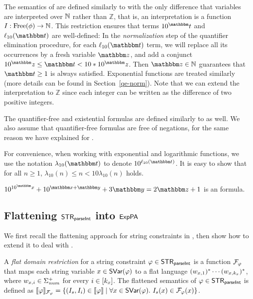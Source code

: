 The semantics of {\paexp} are defined similarly to {\pa} with the only difference that variables are interpreted over $\mathbb{N}$ rather than $\mathbb Z$, that is, an interpretation is a function $I:\mathrm{Free}(\phi)\to \mathbb {\mathbb{N}}$. 
This restriction ensures that terms $10^\iterm$ and $\ell_{10}(\iterm)$ are well-defined: In the \emph{normalization} step of the quantifier elimination procedure, for each $\ell_{10}(\iterm)$ term, we will replace all its occurrences by a fresh variable $\ivarz$, and add a conjunct $10^\ivarz \le \iterm < 10*10^\ivarz$. 
Then $\ivarz\in\Nat$ guarantees that $\iterm \ge 1$ is always satisfied.
Exponential functions are treated similarly
(more details can be found in Section~\ref{qe-norm}).
Note that we can extend the interpretation to $\mathbb Z$ since each integer can be written as the difference of two positive integers.

The quantifier-free and existential {\paexp} formulas are defined similarly to {\pa} as well.
We also assume that quantifier-free {\paexp} formulas are free of negations, for the same reason we have explained for {\pa}.

For convenience, when working with exponential and logarithmic functions, we use the notation $\lambda_{10}(\iterm)$ to denote $10^{\ell_{10}(\iterm)}$. It is easy to show that for all $n \ge 1$, $\lambda_{10}(n) \le n < 10\lambda_{10}(n)$ holds.

\begin{example}
$10^{10^\ivarx}+10^{\ivarx+ \ivary} + 3\ivary    = 2 \ivarz +1 $ is an {\paexp} formula.
\end{example} 
 
\subsection{Flattening ${\sf STR}_{\textsf{parseInt}}$ into ${\sf ExpPA}$}

We first recall the flattening approach for string constraints in \cite{Parosh:20:PLDI}, then show how to extend it to deal with {\parseInt}.

A \emph{flat domain restriction} for a string constraint $\varphi\in {\sf STR}_{\textsf{parseInt}}$ is a function $\mathcal{F}_\varphi$ that maps each string variable $x \in \textsf{SVar}(\varphi)$ to a flat language $(w_{x,1})^* \cdots (w_{x, k_x})^*$, where $w_{x, i} \in \Sigma_{\textit{num}}^+$ for every $i \in [k_x]$. 
The flattened semantics of $\varphi \in {\sf STR}_{\textsf{parseInt}}$ is defined as $\llbracket \varphi \rrbracket_{\mathcal{F}_\varphi} = \{(I_s, I_i) \in \llbracket \varphi  \rrbracket \mid \forall x \in \textsf{SVar}(\varphi).\ I_s(x) \in  \mathcal{F}_\varphi(x)\}$.  

